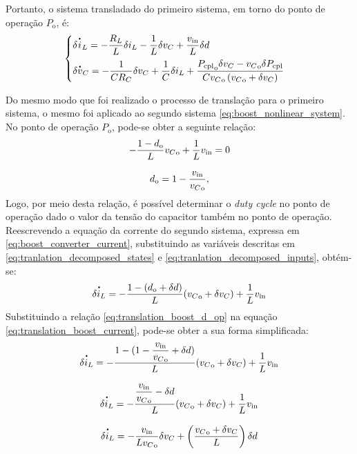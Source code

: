 Portanto, o sistema transladado do primeiro sistema, em torno do ponto de operação $P_{\mathrm{o}}$, é: \begin{equation}
  \begin{cases}
    \displaystyle \delta \dt{i}_L = - \frac{R_L}{L} \delta i_L - \frac{1}{L} \delta v_C  + \frac{v_{\mathrm{in}}}{L} \delta d \\[8pt]
    \displaystyle \delta \dt{v}_C = - \frac{1}{C R_C} \delta v_C  + \frac{1}{C}  \delta i_L + \frac{{P_{\mathrm{cpl}}}_{\mathrm{o}} \delta v_C - {v_C}_{\mathrm{o}} \delta P_{\mathrm{cpl}}}{C {v_C}_{\mathrm{o}} \left({v_C}_{\mathrm{o}} + \delta v_C\right)}
    \label{eq:translated_nonlinear_buck}
  \end{cases}
\end{equation}

Do mesmo modo que foi realizado o processo de translação para o primeiro sistema, o mesmo foi aplicado ao segundo sistema \eqref{eq:boost_nonlinear_system}. No ponto de operação $P_{\mathrm{o}}$, pode-se obter a seguinte relação: \begin{gather}
  - \frac{1 - d_{\mathrm{o}}}{L}{v_C}_{\mathrm{o}} + \frac{1}{L}v_{\mathrm{in}} = 0 \notag \\[8pt]
  {d}_{\mathrm{o}} = 1 - \frac{v_{\mathrm{in}}}{{v_C}_{\mathrm{o}}} \label{eq:translation_boost_d_op},
\end{gather} Logo, por meio desta relação, é possível determinar o \textit{duty cycle }no ponto de operação dado o valor da tensão do capacitor também no ponto de operação. Reescrevendo a equação da corrente do segundo sistema, expressa em \eqref{eq:boost_converter_current}, substituindo as variáveis descritas em \eqref{eq:tranlation_decomposed_states} e \eqref{eq:tranlation_decomposed_inputs}, obtém-se: \begin{gather}
  \dt{\delta i_L}  = - \frac{1 - (d_{\mathrm{o}} + \delta d) }{L} ({v_C}_{\mathrm{o}} + \delta v_C) + \frac{1}{L} v_{\mathrm{in}} \label{eq:translation_boost_current}
\end{gather} Substituindo a relação \eqref{eq:translation_boost_d_op} na equação \eqref{eq:translation_boost_current}, pode-se obter a sua forma simplificada: \begin{gather}
  \dt{\delta i_L}  = - \frac{1 - (1 - \displaystyle \frac{v_{\mathrm{in}}}{{v_C}_{\mathrm{o}}} + \delta d) }{L} ({v_C}_{\mathrm{o}} + \delta v_C) + \frac{1}{L} v_{\mathrm{in}} \notag  \\[8pt]
  \dt{\delta i_L}  = - \frac{\displaystyle \frac{v_{\mathrm{in}}}{{v_C}_{\mathrm{o}}} - \delta d }{L} ({v_C}_{\mathrm{o}} + \delta v_C) + \frac{1}{L} v_{\mathrm{in}} \notag  \\[8pt]
  \dt{\delta i_L}  = - \frac{v_{\mathrm{in}}}{L{v_C}_{\mathrm{o}}}\delta v_C + \left(\frac{{v_C}_{\mathrm{o}} + \delta {v_C}}{L}\right) \delta d
\end{gather}


